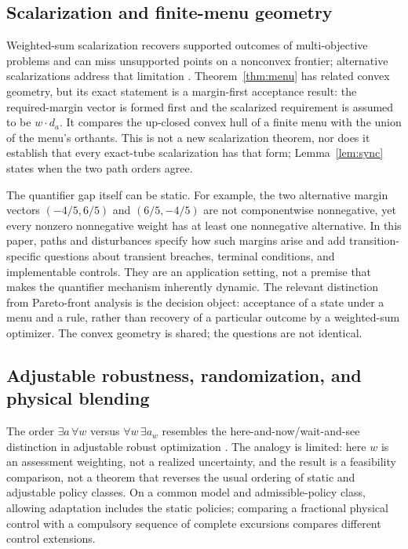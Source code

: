 \documentclass[preprint,11pt,authoryear]{elsarticle}
\theoremstyle{definition}
\theoremstyle{remark}
\begin{document}
\subsection{Scalarization and finite-menu geometry}

Weighted-sum scalarization recovers supported outcomes of multi-objective problems and can miss unsupported points on a nonconvex frontier; alternative scalarizations address that limitation \citep{Koski1985,AthanPapalambros1996,DasDennis1997,Miettinen1999,Ehrgott2005,MessacMattson2002}. Theorem~\ref{thm:menu} has related convex geometry, but its exact statement is a margin-first acceptance result: the required-margin vector is formed first and the scalarized requirement is assumed to be $w\cdot d_a$. It compares the up-closed convex hull of a finite menu with the union of the menu's orthants. This is not a new scalarization theorem, nor does it establish that every exact-tube scalarization has that form; Lemma~\ref{lem:sync} states when the two path orders agree.

The quantifier gap itself can be static. For example, the two alternative margin vectors $(-4/5,6/5)$ and $(6/5,-4/5)$ are not componentwise nonnegative, yet every nonzero nonnegative weight has at least one nonnegative alternative. In this paper, paths and disturbances specify how such margins arise and add transition-specific questions about transient breaches, terminal conditions, and implementable controls. They are an application setting, not a premise that makes the quantifier mechanism inherently dynamic. The relevant distinction from Pareto-front analysis is the decision object: acceptance of a state under a menu and a rule, rather than recovery of a particular outcome by a weighted-sum optimizer. The convex geometry is shared; the questions are not identical.

\subsection{Adjustable robustness, randomization, and physical blending}

The order $\exists a\,\forall w$ versus $\forall w\,\exists a_w$ resembles the here-and-now/wait-and-see distinction in adjustable robust optimization \citep{BenTal2004,BenTal2009}. The analogy is limited: here $w$ is an assessment weighting, not a realized uncertainty, and the result is a feasibility comparison, not a theorem that reverses the usual ordering of static and adjustable policy classes. On a common model and admissible-policy class, allowing adaptation includes the static policies; comparing a fractional physical control with a compulsory sequence of complete excursions compares different control extensions.
\end{document}
